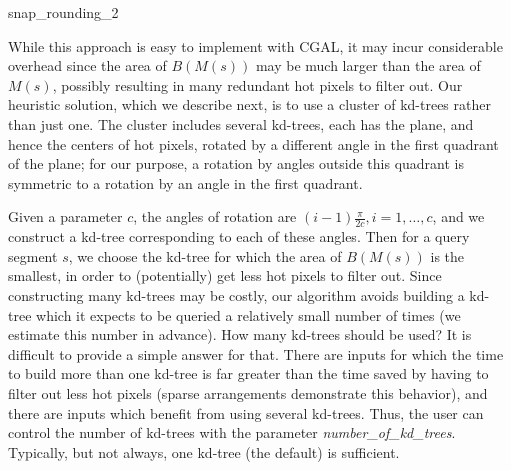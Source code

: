 \begin{ccRefFunction}{snap_rounding_2}
\begin{ccAdvanced}
 While this approach is easy to implement with CGAL, it may incur
 considerable overhead since the area of $B(M(s))$ may be much larger
 than the area of $M(s)$, possibly resulting in many redundant hot pixels
 to filter out. Our heuristic solution, which we describe next, is to
 use a cluster of kd-trees rather than just one.  The cluster includes
 several kd-trees, each has the plane, and hence the centers of hot
 pixels, rotated by a different angle in the first quadrant of the
 plane; for our purpose, a rotation by angles outside this quadrant
 is symmetric to a rotation by an angle in the first quadrant.

 Given a parameter $c$, the angles of rotation are $(i - 1)
 \frac{\pi}{2c}, i=1,\ldots,c$, and we construct a kd-tree
 corresponding to each of these angles. Then for a query segment $s$,
 we choose the kd-tree for which the area of $B(M(s))$ is the smallest,
 in order to (potentially) get less hot pixels to filter out.  Since
 constructing many kd-trees may be costly, our algorithm avoids
 building a kd-tree which it expects to be queried a relatively small
 number of times (we estimate this number in advance).  How many
 kd-trees should be used?  It is difficult to provide a simple
 answer for that.  There are inputs for which the time to build more
 than one kd-tree is far greater than the time saved by having to
 filter out less hot pixels (sparse arrangements demonstrate this
 behavior), and there are inputs which benefit from using several
 kd-trees. Thus, the user can control the number of kd-trees
 with the parameter {\it number\_of\_kd\_trees}. Typically, but not
 always, one kd-tree (the default) is sufficient.

\end{ccAdvanced}


\end{ccRefFunction}

